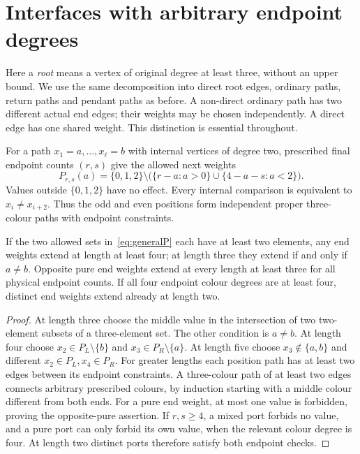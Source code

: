 \section{Interfaces with arbitrary endpoint degrees}\label{sec:generalports}

Here a \emph{root} means a vertex of original degree at least three,
without an upper bound. We use the same decomposition into direct root
edges, ordinary paths, return paths and pendant paths as before. A
non-direct ordinary path has two different actual end edges; their
weights may be chosen independently. A direct edge has one shared weight.
This distinction is essential throughout.

For a path $x_1=a,\ldots,x_\ell=b$ with internal vertices of degree two,
prescribed final endpoint counts $(r,s)$ give the allowed next weights
\begin{equation}\label{eq:generalP}
 P_{r,s}(a)=\{0,1,2\}\setminus
 \bigl(\{r-a:a>0\}\cup\{4-a-s:a<2\}\bigr).
\end{equation}
Values outside $\{0,1,2\}$ have no effect. Every internal comparison is
equivalent to $x_i\ne x_{i+2}$. Thus the odd and even positions form
independent proper three-colour paths with endpoint constraints.

\begin{lemma}\label{lem:generalpath}
If the two allowed sets in~\eqref{eq:generalP} each have at least two
elements, any end weights extend at length at least four; at length
three they extend if and only if $a\ne b$. Opposite pure end weights
extend at every length at least three for all physical endpoint counts.
If all four endpoint colour degrees are at least four, distinct end
weights extend already at length two.
\end{lemma}
\begin{proof}
At length three choose the middle value in the intersection of two
two-element subsets of a three-element set. The other condition is
$a\ne b$. At length four choose $x_2\in P_L\setminus\{b\}$ and
$x_3\in P_R\setminus\{a\}$. At length five choose
$x_3\notin\{a,b\}$ and different $x_2\in P_L,x_4\in P_R$.
For greater lengths each position path has at least two edges between
its endpoint constraints. A three-colour path of at least two edges
connects arbitrary prescribed colours, by induction starting with a
middle colour different from both ends. For a pure end weight, at most
one value is forbidden, proving the opposite-pure assertion. If
$r,s\ge4$, a mixed port forbids no value, and a pure port can only
forbid its own value, when the relevant colour degree is four. At
length two distinct ports therefore satisfy both endpoint checks.
\end{proof}

